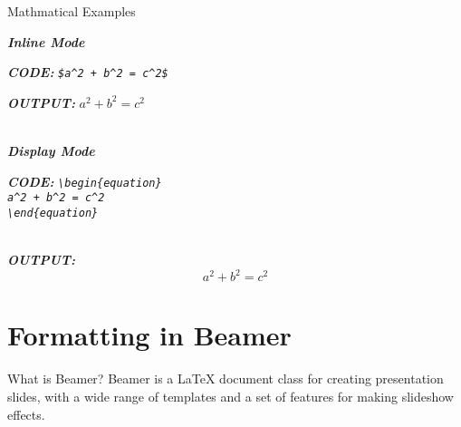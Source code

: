 \documentclass[pdf]{beamer}
\begin{document}
\begin{frame}{Mathmatical Examples}
    \par \textbf{\textit{Inline Mode}}
    \par \textbf{\textit{CODE:}} {\textit{\texttt{\$a\^{}2 + b\^{}2 = c\^{}2\$}}}
    \par \textbf{\textit{OUTPUT:}} $a^2 + b^2 = c^2$
    \par \textbf{\textit{\\Display Mode}}
    \par \textbf{\textit{CODE:}} {\textit{\texttt{\textbackslash begin\{equation\} \\ a\^{}2 + b\^{}2 = c\^{}2 \\ \textbackslash end\{equation\}}}}
    \par \textbf{\textit{\\OUTPUT:}} \begin{equation} a^2 + b^2 = c^2 \end{equation}
\end{frame}



\section{Formatting in Beamer}
\begin{frame}{What is Beamer?}
    Beamer is a LaTeX document class for 
    creating presentation slides, with a 
    wide range of templates and a set of 
    features for making slideshow effects. 
\end{frame}
\end{document}
